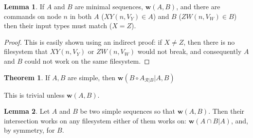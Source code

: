 \documentclass[12pt]{article}
\newcommand{\fscommand}[2]{{#1#2}}
\newcommand{\cxy}{\fscommand{X}{Y}}
\newcommand{\czw}{\fscommand{Z}{W}}
\newcommand{\cc}{\circ} %
\newcommand{\works}[1]{{\mathbf{w}}({#1})}
\newcommand{\worksc}[2]{{\mathbf{w}}({#1}|{#2})}
\newcommand{\ordered}[1]{#1}
\newcommand{\recchar}[3]{{#1}^{#3}_{\mathcal{R}|{#2}}}
\newcommand{\reca}{\recchar{A}{B}{}} %
\theoremstyle{definition}
\newtheorem{mylem}{Lemma}
\newtheorem{myth}{Theorem}
\begin{document}
\begin{mylem}\label{worksinputmatch}
If $A$ and $B$ are minimal sequences, $\works{A,B}$,
and there are commands on node $n$ in both $A$ ($\cxy(n, V_Y)\in A$) and $B$ ($\czw(n, V_W)\in B$)
then their input types must match ($X=Z$).
\end{mylem}
\begin{proof}
This is easily shown using an indirect proof: if $X\neq Z$, then there is no filesystem that
$\cxy(n, V_Y)$ or $\czw(n, V_W)$ would not break, and consequently $A$ and $B$ could not work on the same filesystem.
\end{proof}













\begin{myth}
If $A, B$ are simple, then $\worksc{B\cc \reca}{A,B}$
\end{myth}

This is trivial unless $\works{A,B}$.

\begin{mylem}
Let $A$ and $B$ be two simple sequences so that $\works{A, B}$.
Then their intersection works on any filesystem
either of them works on:
$\worksc{\ordered{A\cap B}}{A}$, and, by symmetry, for $B$.
\end{mylem}
\end{document}
